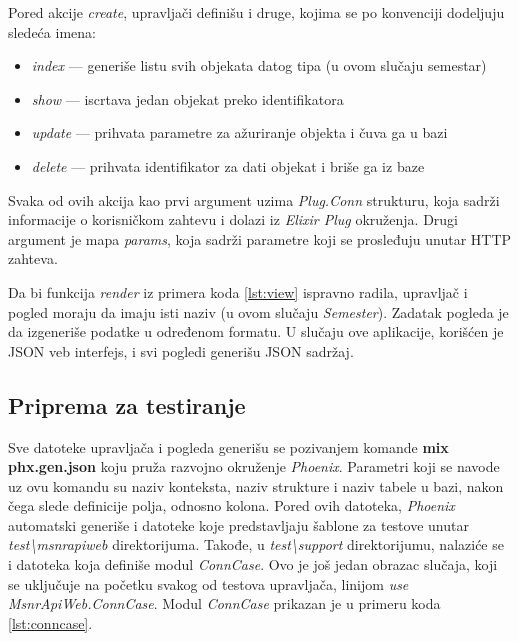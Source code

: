 \documentclass[12pt,oneside]{memoir}
\begin{document}
\par Pored akcije \emph{create}, upravljači definišu i druge, kojima se po konvenciji dodeljuju sledeća imena: 
\begin{itemize}
\item \emph{index} --- generiše listu svih objekata datog tipa (u ovom slučaju semestar)
\item \emph{show} --- iscrtava jedan objekat preko identifikatora
\item \emph{update} --- prihvata parametre za ažuriranje objekta i čuva ga u bazi
\item \emph{delete} --- prihvata identifikator za dati objekat i briše ga iz baze
\end{itemize}

\par Svaka od ovih akcija kao prvi argument uzima \emph{Plug.Conn} strukturu, koja sadrži informacije o korisničkom zahtevu i dolazi iz \emph{Elixir Plug} okruženja. Drugi argument je mapa \emph{params}, koja sadrži parametre koji se prosleđuju unutar HTTP zahteva.
\par Da bi funkcija \emph{render} iz primera koda \ref{lst:view} ispravno radila, upravljač i pogled moraju da imaju isti naziv (u ovom slučaju \emph{Semester}). Zadatak pogleda je da izgeneriše podatke u određenom formatu. U slučaju ove aplikacije, korišćen je JSON veb interfejs, i svi pogledi generišu JSON sadržaj.

\subsection{Priprema za testiranje}

\par Sve datoteke upravljača i pogleda generišu se pozivanjem komande \textbf{mix phx.gen.json} koju pruža razvojno okruženje \emph{Phoenix}. Parametri koji se navode uz ovu komandu su naziv konteksta, naziv strukture i naziv tabele u bazi, nakon čega slede definicije polja, odnosno kolona. Pored ovih datoteka, \emph{Phoenix} automatski generiše i datoteke koje predstavljaju šablone za testove unutar \emph{test{\textbackslash}msnr{\textunderscore}api{\textunderscore}web} direktorijuma. Takođe, u \emph{test{\textbackslash}support} direktorijumu, nalaziće se i datoteka koja definiše modul \emph{ConnCase}. Ovo je još jedan obrazac slučaja, koji se uključuje na početku svakog od testova upravljača, linijom \emph{use MsnrApiWeb.ConnCase}. Modul \emph{ConnCase} prikazan je u primeru koda \ref{lst:conncase}.
\end{document}
